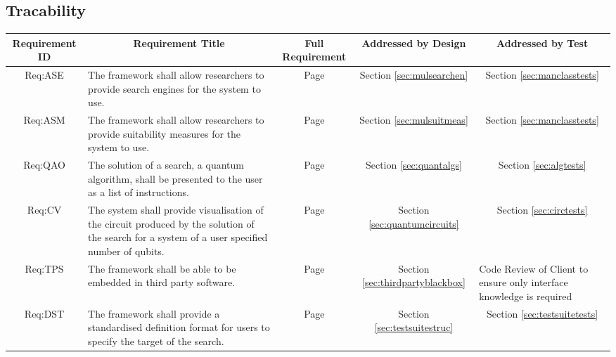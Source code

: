 \clearpage
\begin{landscape}
\section{Tracability}
\label{sec:tracability}

\centering
\noindent\begin{longtable}{|c|m{10cm}|c|c|m{4cm}|}
\hline
\textbf{Requirement ID} &
\multicolumn{1}{c|}{\textbf{Requirement Title}} &
\textbf{Full Requirement} &
\textbf{Addressed by Design} &
\multicolumn{1}{c|}{\textbf{Addressed by Test}} \\ \hline

Req:ASE &
The framework shall allow researchers to provide search engines for the system to use. &
Page \pageref{sec:reqase} &
Section \ref{sec:mulsearchen} &
\multicolumn{1}{c|}{Section \ref{sec:manclasstests}}\\ \hline

Req:ASM &
The framework shall allow researchers to provide suitability measures for the system to use. &
Page \pageref{sec:reqasm} &
Section \ref{sec:mulsuitmeas} &
\multicolumn{1}{c|}{Section \ref{sec:manclasstests}}\\ \hline

Req:QAO &
The solution of a search, a quantum algorithm, shall be presented to the user as a list of instructions. &
Page \pageref{sec:reqqao} &
Section \ref{sec:quantalgs} &
\multicolumn{1}{c|}{Section \ref{sec:algtests}} \\ \hline

Req:CV &
The system shall provide visualisation of the circuit produced by the solution of the search for a system of a user specified number of qubits. &
Page \pageref{sec:reqcv} &
Section \ref{sec:quantumcircuits} &
\multicolumn{1}{c|}{Section \ref{sec:circtests}} \\ \hline

Req:TPS &
The framework shall be able to be embedded in third party software. &
Page \pageref{sec:reqtps} &
Section \ref{sec:thirdpartyblackbox} &
Code Review of Client to ensure only interface knowledge is required\\ \hline

Req:DST &
The framework shall provide a standardised definition format for users to specify the target of the search. &
Page \pageref{sec:reqdst} &
Section \ref{sec:testsuitestruc} &
\multicolumn{1}{c|}{Section \ref{sec:testsuitetests}} \\ \hline


\end{longtable}
\end{landscape}
